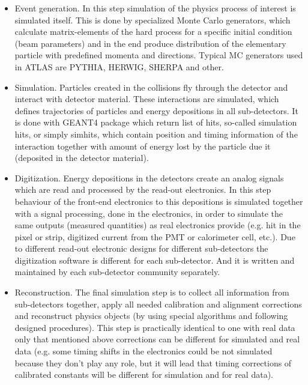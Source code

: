 \begin{itemize}
 \item Event generation. In this step simulation of the physics process of interest is simulated itself. This is done by specialized Monte Carlo generators, which calculate matrix-elements of the
 hard process for a specific initial condition (beam parameters) and in the end produce distribution of the elementary particle with predefined momenta and directions. Typical MC generators used in ATLAS
 are PYTHIA, HERWIG, SHERPA and other.
 \item Simulation. Particles created in the collisions fly through the detector and interact with detector material. These interactions are simulated, which defines trajectories of particles and
 energy depositions in all sub-detectors. 
 It is done with GEANT4 package which return list of hits, so-called simulation hits, or simply simhits, which contain position and timing information of 
 the interaction together with amount of energy lost by the particle due it (deposited in the detector material).
 \item Digitization. Energy depositions in the detectors create an analog signals which are read and processed by the read-out electronics. In this step behaviour of the front-end electronics to this
 depositions is simulated together with a signal processing, done in the electronics, in order to simulate the same outputs (measured quantities) as real electronics provide (e.g. hit in the pixel or strip,
 digitized current from the PMT or calorimeter cell, etc.). Due to different read-out electronic designs for different sub-detectors the digitization software is different for each sub-detector.
 And it is written and maintained by each sub-detector community separately.
 \item Reconstruction. The final simulation step is to collect all information from sub-detectors together, apply all needed calibration and alignment corrections and reconstruct physics objects 
 (by using special algorithms and following designed procedures). This step is practically identical to one with real data only that mentioned above corrections can be different for simulated and real 
 data (e.g. some timing shifts in the electronics could be not simulated because they don't play any role, but it will lead that timing corrections of calibrated constants will be different 
 for simulation and for real data).
\end{itemize}

